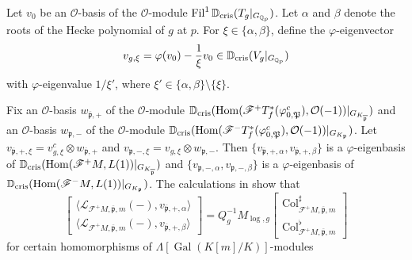 \documentclass{amsart}
\numberwithin{equation}{section}
\newcommand{\bb}{\mathbb}
\newcommand{\frk}{\mathfrak}
\newcommand{\Gal}{\operatorname{Gal}}
\newcommand{\Fil}{\operatorname{Fil}}
\newcommand{\col}{\mathrm{Col}}
\newcommand{\Hom}{\mathrm{Hom}}
\newcommand{\Dcris}{\mathbb{D}_{\rm cris}}
\begin{document}
Let $v_0$ be an $\mathcal{O}$-basis of the $\mathcal{O}$-module $\Fil^1\Dcris(T_g\vert_{G_{\bb{Q}_p}})$. Let $\alpha$ and $\beta$ denote the roots of the Hecke polynomial of $g$ at $p$. For $\xi\in\lbrace \alpha,\beta\rbrace$, define the $\varphi$-eigenvector
\[
v_{g,\xi}=\varphi(v_0)-\frac{1}{\xi}v_0 \in \Dcris(V_g\vert_{G_{\bb{Q}_p}})
\]
with $\varphi$-eigenvalue $1/{\xi'}$, where $\xi'\in\lbrace \alpha,\beta\rbrace\setminus\lbrace \xi\rbrace$.

Fix an $\mathcal{O}$-basis $w_{\overline{\frk{p}},+}$ of the $\mathcal{O}$-module $\Dcris(\Hom(\mathscr{F}^+ T_f^\ast(\varphi_{0,\frk{P}}^c),\mathcal{O}(-1))\vert_{G_{K_{\overline{\frk{p}}}}})$ and an $\mathcal{O}$-basis $w_{\frk{p},-}$ of the $\mathcal{O}$-module $\Dcris(\Hom(\mathscr{F}^- T_f^\ast(\varphi_{0,\frk{P}}^c),\mathcal{O}(-1))\vert_{G_{K_\frk{p}}})$.
Let $v_{\overline{\frk{p}},+,\xi}=v_{g,\xi}^c\otimes w_{\overline{\frk{p}},+}$ and $v_{\frk{p},-,\xi}=v_{g,\xi}\otimes w_{\frk{p},-}$. 
Then $\lbrace v_{\overline{\frk{p}},+,\alpha},v_{\overline{\frk{p}},+,\beta}\rbrace$ is a $\varphi$-eigenbasis of $\Dcris(\Hom(\mathscr{F}^{+}M,L(1))\vert_{G_{K_{\overline{\frk{p}}}}})$ and $\lbrace v_{\frk{p},-,\alpha},v_{\frk{p},-,\beta}\rbrace$ is a $\varphi$-eigenbasis of $\Dcris(\Hom(\mathscr{F}^{-}M,L(1))\vert_{G_{K_{\frk{p}}}})$.
The calculations in \cite[\S2.3]{BFSuper} show that
\begin{equation}
\begin{bmatrix}
    \langle \mathcal{L}_{\mathscr{F}^+ M,\overline{\frk{p}},m}(-),v_{\overline{\frk{p}},+,\alpha}\rangle \\
    \langle \mathcal{L}_{\mathscr{F}^+ M,\overline{\frk{p}},m}(-),v_{\overline{\frk{p}},+,\beta}\rangle
\end{bmatrix}
= Q_g^{-1}M_{\log,g}
\begin{bmatrix}
    \col_{\mathscr{F}^+ M,\overline{\frk{p}},m}^{\sharp} \\
    \col_{\mathscr{F}^+ M,\overline{\frk{p}},m}^{\flat}
\end{bmatrix}
\label{eq:Col-decompo+}    
\end{equation}
for certain homomorphisms of $\Lambda[\Gal(K[m]/K)]$-modules
\end{document}
